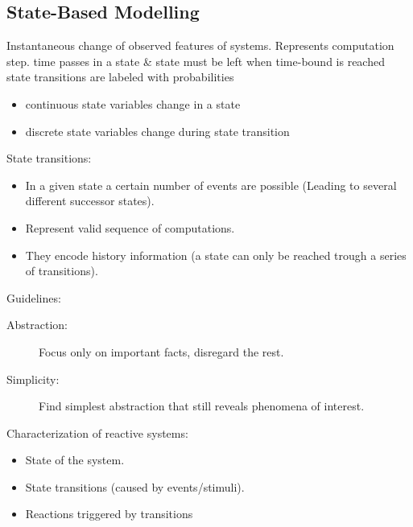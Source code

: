 \documentclass[a4paper, 10pt]{article}
\begin{document}
\subsection{State-Based Modelling}
\begin{mdframed}[roundcorner=5pt,
subtitlebelowline=false,subtitleaboveline=false,
subtitlebackgroundcolor=blue!30,
frametitlerule=true,
frametitlebackgroundcolor=blue!30,
frametitle={State Transition in Discrete Systems}
]
Instantaneous change of observed features of systems. Represents computation step.
time passes in a state \& state must be left when time-bound is reached
state transitions are labeled with probabilities
\begin{itemize}
    \item continuous state variables change in a state
    \item discrete state variables change during state transition
\end{itemize}
\end{mdframed}

State transitions:
\begin{itemize}
    \item In a given state a certain number of events are possible (Leading to several different successor states).
    \item Represent valid sequence of computations.
    \item They encode history information (a state can only be reached trough a series of transitions).
\end{itemize}

Guidelines:
\begin{description}
    \item[Abstraction:] Focus only on important facts, disregard the rest.
    \item[Simplicity:] Find simplest abstraction that still reveals phenomena of interest.
\end{description}

Characterization of reactive systems:
\begin{itemize}
    \item State of the system.
    \item State transitions (caused by events/stimuli).
    \item Reactions triggered by transitions
\end{itemize}
\end{document}
